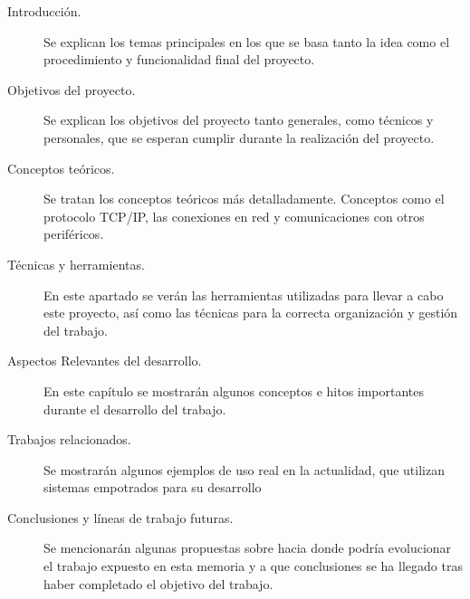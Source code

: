 \begin{description}
	\item[Introducción.] Se explican los temas principales en los que se basa tanto la idea como el procedimiento y funcionalidad final del proyecto.

	\item[Objetivos del proyecto.] Se explican los objetivos del proyecto tanto generales, como técnicos y personales, que se esperan cumplir durante la realización del proyecto.

	\item[Conceptos teóricos.] Se tratan los conceptos teóricos más detalladamente. Conceptos como el protocolo TCP/IP, las conexiones en red y comunicaciones con otros periféricos.

	\item[Técnicas y herramientas.] En este apartado se verán las herramientas utilizadas para llevar a cabo este proyecto, así como las técnicas para la correcta organización y gestión del trabajo.

	\item[Aspectos Relevantes del desarrollo.] En este capítulo se mostrarán algunos conceptos e hitos importantes durante el desarrollo del trabajo.

	\item[Trabajos relacionados.] Se mostrarán algunos ejemplos de uso real en la actualidad, que utilizan sistemas empotrados para su desarrollo

	\item[Conclusiones y líneas de trabajo futuras.] Se mencionarán algunas propuestas sobre hacia donde podría evolucionar el trabajo expuesto en esta memoria y a que conclusiones se ha llegado tras haber completado el objetivo del trabajo.
\end{description}

